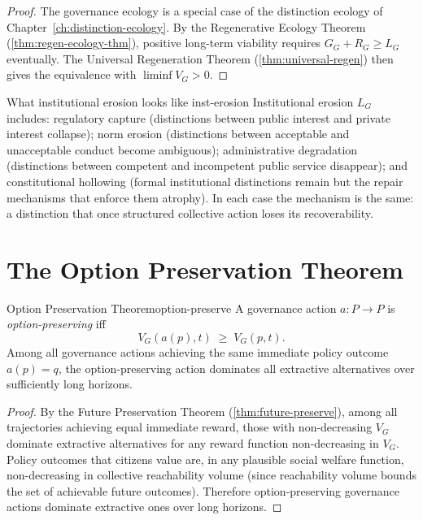 \documentclass[12pt,twoside,openright]{book}
\begin{document}
\begin{proof}
  The governance ecology is a special case of the
  distinction ecology of Chapter~\ref{ch:distinction-ecology}.
  By the Regenerative Ecology Theorem
  (\cref{thm:regen-ecology-thm}), positive long-term
  viability requires $G_G + R_G \ge L_G$ eventually.
  The Universal Regeneration Theorem
  (\cref{thm:universal-regen}) then gives the
  equivalence with $\liminf V_G > 0$.
\end{proof}

\begin{remark}{What institutional erosion looks like}%
  {inst-erosion}
  Institutional erosion $L_G$ includes: regulatory
  capture (distinctions between public interest and
  private interest collapse); norm erosion (distinctions
  between acceptable and unacceptable conduct become
  ambiguous); administrative degradation (distinctions
  between competent and incompetent public service
  disappear); and constitutional hollowing
  (formal institutional distinctions remain but
  the repair mechanisms that enforce them atrophy).
  In each case the mechanism is the same:
  a distinction that once structured collective action
  loses its recoverability.
\end{remark}

\section{The Option Preservation Theorem}

\begin{theorem}{Option Preservation Theorem}{option-preserve}
  A governance action $a: P \to P$ is \emph{option-preserving}
  iff
  \[
    V_G(a(p), t) \;\ge\; V_G(p, t).
  \]
  Among all governance actions achieving the same
  immediate policy outcome $a(p) = q$, the
  option-preserving action dominates all extractive
  alternatives over sufficiently long horizons.
\end{theorem}

\begin{proof}
  By the Future Preservation Theorem
  (\cref{thm:future-preserve}), among all trajectories
  achieving equal immediate reward, those with
  non-decreasing $V_G$ dominate extractive alternatives
  for any reward function non-decreasing in $V_G$.
  Policy outcomes that citizens value are, in any
  plausible social welfare function, non-decreasing
  in collective reachability volume (since reachability
  volume bounds the set of achievable future outcomes).
  Therefore option-preserving governance actions
  dominate extractive ones over long horizons.
\end{proof}
\end{document}
